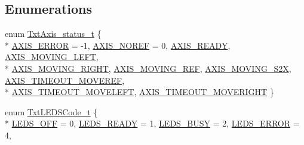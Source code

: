 \subsection*{Enumerations}
\begin{DoxyCompactItemize}
\item 
enum \hyperlink{namespaceft_a05630ec9d5a49c43a00ca107cfe6b350}{Txt\+Axis\+\_\+status\+\_\+t} \{ \\*
\hyperlink{namespaceft_a05630ec9d5a49c43a00ca107cfe6b350afd04a40f2ba7505a5ef45e1c0797b03a}{A\+X\+I\+S\+\_\+\+E\+R\+R\+OR} = -\/1, 
\hyperlink{namespaceft_a05630ec9d5a49c43a00ca107cfe6b350a5c02552a45f38aaa8a1c164bf3567ba0}{A\+X\+I\+S\+\_\+\+N\+O\+R\+EF} = 0, 
\hyperlink{namespaceft_a05630ec9d5a49c43a00ca107cfe6b350a0adf19524d38cda1cb65aebb02501812}{A\+X\+I\+S\+\_\+\+R\+E\+A\+DY}, 
\hyperlink{namespaceft_a05630ec9d5a49c43a00ca107cfe6b350ab3a7e1ddcfaf7772aa10476d7c22365a}{A\+X\+I\+S\+\_\+\+M\+O\+V\+I\+N\+G\+\_\+\+L\+E\+FT}, 
\\*
\hyperlink{namespaceft_a05630ec9d5a49c43a00ca107cfe6b350a462d5852c83d8ba5d2a210c58462354a}{A\+X\+I\+S\+\_\+\+M\+O\+V\+I\+N\+G\+\_\+\+R\+I\+G\+HT}, 
\hyperlink{namespaceft_a05630ec9d5a49c43a00ca107cfe6b350aad36ff6986b122cf918bfe2f0855a3b5}{A\+X\+I\+S\+\_\+\+M\+O\+V\+I\+N\+G\+\_\+\+R\+EF}, 
\hyperlink{namespaceft_a05630ec9d5a49c43a00ca107cfe6b350afd07f75881975ae609dd3ea518fecbe5}{A\+X\+I\+S\+\_\+\+M\+O\+V\+I\+N\+G\+\_\+\+S2X}, 
\hyperlink{namespaceft_a05630ec9d5a49c43a00ca107cfe6b350a766235e3405ec1332f33b83c4ffc37fa}{A\+X\+I\+S\+\_\+\+T\+I\+M\+E\+O\+U\+T\+\_\+\+M\+O\+V\+E\+R\+EF}, 
\\*
\hyperlink{namespaceft_a05630ec9d5a49c43a00ca107cfe6b350a9a0e39b1bad029e7833dfabd050ed422}{A\+X\+I\+S\+\_\+\+T\+I\+M\+E\+O\+U\+T\+\_\+\+M\+O\+V\+E\+L\+E\+FT}, 
\hyperlink{namespaceft_a05630ec9d5a49c43a00ca107cfe6b350a4c24c1b2db17cf1e106881dab90f0886}{A\+X\+I\+S\+\_\+\+T\+I\+M\+E\+O\+U\+T\+\_\+\+M\+O\+V\+E\+R\+I\+G\+HT}
 \}
\item 
enum \hyperlink{namespaceft_a14147563037506fac6464a9f6bcbad40}{Txt\+L\+E\+D\+S\+Code\+\_\+t} \{ \\*
\hyperlink{namespaceft_a14147563037506fac6464a9f6bcbad40a1bcf7945061fcfaa001c2834de03007a}{L\+E\+D\+S\+\_\+\+O\+FF} = 0, 
\hyperlink{namespaceft_a14147563037506fac6464a9f6bcbad40a9c418d1ea34c579857dbb0801fe8aa4d}{L\+E\+D\+S\+\_\+\+R\+E\+A\+DY} = 1, 
\hyperlink{namespaceft_a14147563037506fac6464a9f6bcbad40ab2246f56c123b5f0c4987bbd0c186771}{L\+E\+D\+S\+\_\+\+B\+U\+SY} = 2, 
\hyperlink{namespaceft_a14147563037506fac6464a9f6bcbad40aa3d6e20b43149feaabd9a47341449830}{L\+E\+D\+S\+\_\+\+E\+R\+R\+OR} = 4, 

\end{DoxyCompactItemize}
